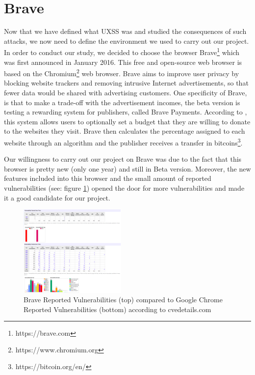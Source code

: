 \documentclass[journal]{IEEEtran}
\begin{document}
\section{Brave}

Now that we have defined what UXSS was and studied the consequences of such attacks, we now need to define the environment we used to carry out our project. \\
In order to conduct our study, we decided to choose the browser Brave\footnote{https://brave.com} which was first announced in January 2016. This free and open-source web browser is based on the Chromium\footnote{https://www.chromium.org} web browser. Brave aims to improve user privacy by blocking website trackers and removing intrusive Internet advertisements, so that fewer data would be shared with advertising customers. One specificity of Brave, is that to make a trade-off with the advertisement incomes, the beta version is testing a rewarding system for publishers, called Brave Payments. According to \cite{braveWikipedia}, this system allows users to optionally set a budget that they are willing to donate to the websites they visit. Brave then calculates the percentage assigned to each website through an algorithm and the publisher receives a transfer in bitcoins\footnote{https://bitcoin.org/en/}.

\medskip

Our willingness to carry out our project on Brave was due to the fact that this browser is pretty new (only one year) and still in Beta version. Moreover, the new features included into this browser and the small amount of reported vulnerabilities (see: figure \ref{fig:BraveReportedVulnerabilities}) opened the door for more vulnerabilities and made it a good candidate for our project.

\begin{figure}[h]
\centering
\includegraphics[width=0.47\textwidth]{images/BraveReportedVulnerabilities.png}
\caption{Brave Reported Vulnerabilities (top) compared to Google Chrome Reported Vulnerabilities (bottom) according to cvedetails.com}
\label{fig:BraveReportedVulnerabilities}
\end{figure}
\end{document}
